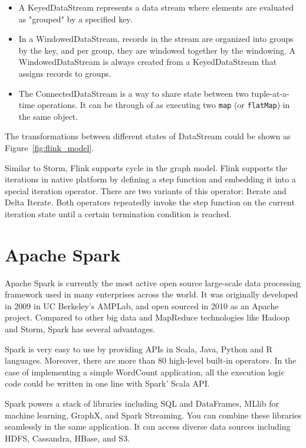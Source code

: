 \begin{itemize}
\item A KeyedDataStream represents a data stream where elements are evaluated as "grouped" by a specified key. 
\item In a WindowedDataStream, records in the stream are organized into groups by the key, and per group, they are windowed together by the windowing. A WindowedDataStream is always created from a KeyedDataStream that assigns records to groups.
\item The ConnectedDataStream is a way to share state between two tuple-at-a-time operations. It can be through of as executing two \texttt{map} (or \texttt{flatMap}) in the same object.
\end{itemize}

The transformations between different states of DataStream could be shown as Figure~\ref{fig:flink_model}. 

Similar to Storm, Flink supports cycle in the graph model. Flink supports the iterations in native platform by defining a step function and embedding it into a special iteration operator. There are two variants of this operator: Iterate and Delta Iterate. Both operators repeatedly invoke the step function on the current iteration state until a certain termination condition is reached.

\section{Apache Spark}
\label{section:spark}

Apache Spark is currently the most active open source large-scale data processing framework used in many enterprises across the world. It was originally developed in 2009 in UC Berkeley's AMPLab, and open sourced in 2010 as an Apache project. Compared to other big data and MapReduce technologies like Hadoop and Storm, Spark has several advantages. 

Spark is very easy to use by providing APIs in Scala, Java, Python and R languages. Moreover, there are more than 80 high-level built-in operators.  In the case of implementing a simple WordCount application, all the execution logic code could be written in one line with Spark' Scala API.

Spark powers a stack of libraries including SQL and DataFrames, MLlib for machine learning, GraphX, and Spark Streaming. You can combine these libraries seamlessly in the same application. It can access diverse data sources including HDFS, Cassandra, HBase, and S3.


